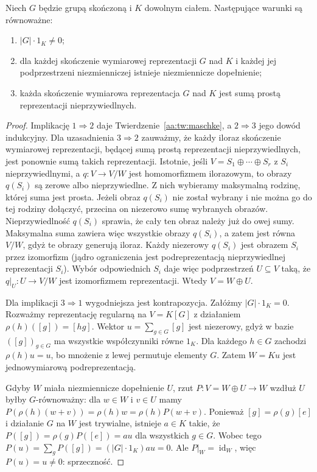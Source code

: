 \begin{twierdzenie}
\label{aa:tw:maschke-necessity}
Niech $G$ będzie grupą skończoną i $K$ dowolnym ciałem.
Następujące warunki są równoważne:
\begin{enumerate}
\item $|G|\cdot1_K\ne0$;
\item dla każdej skończenie wymiarowej reprezentacji $G$
nad $K$ i każdej jej podprzestrzeni niezmienniczej
istnieje niezmiennicze dopełnienie;
\item każda skończenie wymiarowa reprezentacja $G$
nad $K$ jest sumą prostą reprezentacji nieprzywiedlnych.
\end{enumerate}
\end{twierdzenie}
\begin{proof}
Implikację $1\Rightarrow2$ daje
Twierdzenie~\ref{aa:tw:maschke}, a $2\Rightarrow3$
jego dowód indukcyjny.
Dla uzasadnienia $3\Rightarrow2$ zauważmy, że każdy
iloraz skończenie wymiarowej reprezentacji, będącej
sumą prostą reprezentacji nieprzywiedlnych, jest ponownie
sumą takich reprezentacji. Istotnie, jeśli
$V=S_1\oplus\cdots\oplus S_r$ z $S_i$ nieprzywiedlnymi,
a $q:V\to V/W$ jest homomorfizmem ilorazowym, to
obrazy $q(S_i)$ są zerowe albo nieprzywiedlne.
Z nich wybieramy maksymalną rodzinę, której suma jest
prosta. Jeżeli obraz $q(S_i)$ nie został wybrany i nie
można go do tej rodziny dołączyć, przecina on niezerowo
sumę wybranych obrazów. Nieprzywiedlność $q(S_i)$
sprawia, że cały ten obraz należy już do owej sumy.
Maksymalna suma zawiera więc wszystkie obrazy $q(S_i)$,
a zatem jest równa $V/W$, gdyż te obrazy generują iloraz.
Każdy niezerowy $q(S_i)$ jest obrazem
$S_i$ przez izomorfizm (jądro ograniczenia jest
podreprezentacją nieprzywiedlnej reprezentacji $S_i$).
Wybór odpowiednich $S_i$ daje więc podprzestrzeń
$U\subseteq V$ taką, że $q|_U:U\to V/W$ jest
izomorfizmem reprezentacji. Wtedy $V=W\oplus U$.


Dla implikacji $3\Rightarrow1$ wygodniejsza jest
kontrapozycja. Załóżmy $|G|\cdot1_K=0$.
Rozważmy reprezentację regularną na $V=K[G]$
z działaniem $\rho(h)([g])=[hg]$.
Wektor $u=\sum_{g\in G}[g]$ jest niezerowy,
gdyż w bazie $([g])_{g\in G}$ ma wszystkie współczynniki
równe $1_K$. Dla każdego $h\in G$ zachodzi
$\rho(h)u=u$, bo mnożenie z lewej permutuje elementy $G$.
Zatem $W=Ku$ jest jednowymiarową podreprezentacją.

Gdyby $W$ miała niezmiennicze dopełnienie $U$,
rzut $P:V=W\oplus U\to W$ wzdłuż $U$ byłby
$G$-równoważny: dla $w\in W$ i $v\in U$
mamy $P(\rho(h)(w+v))=\rho(h)w=\rho(h)P(w+v)$.
Ponieważ $[g]=\rho(g)[e]$ i działanie $G$ na $W$
jest trywialne, istnieje $a\in K$ takie, że
$P([g])=\rho(g)P([e])=au$ dla wszystkich $g\in G$.
Wobec tego
$P(u)=\sum_gP([g])=(|G|\cdot1_K)au=0$.
Ale $P|_W=\operatorname{id}_W$, więc $P(u)=u\ne0$:
sprzeczność.


\end{proof}
